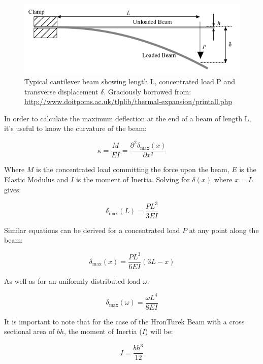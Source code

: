 \begin{figure}[h]
\centering
\includegraphics[width=0.7\linewidth]{../Figures/cantilever.png}
\caption{Typical cantilever beam showing length L, concentrated load P and transverse displacement $ \delta $. Graciously borrowed from: \url{http://www.doitpoms.ac.uk/tlplib/thermal-expansion/printall.php}}
\label{fig:cantilever}
\end{figure}


In order to calculate the maximum deflection at the end of a beam of length L, it's useful to know the curvature of the beam:

\begin{equation}\tag{7.1}
\kappa = \frac{M}{EI} = \frac{\partial^2 \delta_{\text{max}}(x)}{\partial x^2}
\end{equation}

Where $ M $ is the concentrated load committing the force upon the beam, $ E $ is the Elastic Modulus and $ I $ is the moment of Inertia.
Solving for $ \delta(x) $ where $ x = L $ gives:

\begin{equation}\tag{7.2}
\delta_{\text{max}}(L) = \frac{PL^3}{3EI}
\end{equation}

Similar equations can be derived for a concentrated load $ P $ at any point along the beam: 

\begin{equation}\tag{7.3}
\delta_{\text{max}}(x) = \frac{PL^3}{6EI}(3L - x)
\end{equation}

As well as for an uniformly distributed load $ \omega $: 

\begin{equation}\tag{7.4}
\delta_{\text{max}}(\omega) = \frac{\omega L^4}{8EI}
\end{equation}

It is important to note that for the case of the HronTurek Beam with a cross sectional area of $ bh $, the moment of Inertia ($ I $) will be:

\begin{equation}\tag{7.5}
I = \frac{bh^3}{12}
\end{equation}

